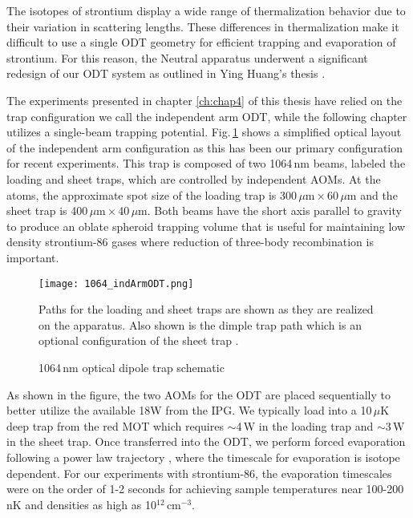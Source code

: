 The isotopes of strontium display a wide range of thermalization behavior due to their variation in scattering lengths.
These differences in thermalization make it difficult to use a single ODT geometry for efficient trapping and evaporation of strontium.
For this reason, the Neutral apparatus underwent a significant redesign of our ODT system as outlined in Ying Huang's thesis \cite{Huang2013}.

The experiments presented in chapter \ref{ch:chap4} of this thesis have relied on the trap configuration we call the independent arm ODT, while the following chapter utilizes a single-beam trapping potential.
Fig.\,\ref{fig:odtSchematic} shows a simplified optical layout of the independent arm configuration as this has been our primary configuration for recent experiments.
This trap is composed of two 1064\,nm beams, labeled the loading and sheet traps, which are controlled by independent AOMs.
At the atoms, the approximate spot size of the loading trap is 300\,$\mu$m\,$\times$\,60\,$\mu$m and the sheet trap is 400\,$\mu$m\,$\times$\,40\,$\mu$m.
Both beams have the short axis parallel to gravity to produce an oblate spheroid trapping volume that is useful for maintaining low density strontium-86 gases where reduction of three-body recombination is important.
	\begin{figure} 
		\centerline{
		\texttt{[image: 1064\_indArmODT.png]}}
		\caption{1064\,nm optical dipole trap schematic}{Paths for the loading and sheet traps are shown as they are realized on the apparatus. Also shown is the dimple trap path which is an optional configuration of the sheet trap \cite{Huang2013}.}
		\label{fig:odtSchematic}
	\end{figure}

As shown in the figure, the two AOMs for the ODT are placed sequentially to better utilize the available 18W from the IPG.
We typically load into a 10\,$\mu$K deep trap from the red MOT which requires $\sim$4\,W in the loading trap and $\sim$3\,W in the sheet trap.
Once transferred into the ODT, we perform forced evaporation following a power law trajectory \cite{OHara2001}, where the timescale for evaporation is isotope dependent.
For our experiments with strontium-86, the evaporation timescales were on the order of 1-2 seconds for achieving sample temperatures near 100-200\,nK and densities as high as 10$^{12}$\,cm$^{-3}$.

